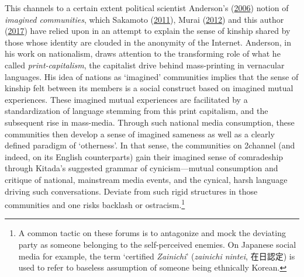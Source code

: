 \documentclass[10pt,british,A4paper,twoside]{memoir}
\begin{document}
This channels to a certain extent political scientist Anderson's
(\protect\hyperlink{ref-anderson_imagined_2006}{2006}) notion of
\emph{imagined communities}, which Sakamoto
(\protect\hyperlink{ref-sakamoto_koreans_2011}{2011}), Murai
(\protect\hyperlink{ref-murai_net_2012}{2012}) and this author
(\protect\hyperlink{ref-poppe_digitaal_2017}{2017}) have relied upon in
an attempt to explain the sense of kinship shared by those whose
identity are clouded in the anonymity of the Internet. Anderson, in his
work on nationalism, draws attention to the transforming role of what he
called \emph{print-capitalism}, the capitalist drive behind
mass-printing in vernacular languages. His idea of nations as `imagined'
communities implies that the sense of kinship felt between its members
is a social construct based on imagined mutual experiences. These
imagined mutual experiences are facilitated by a standardization of
language stemming from this print capitalism, and the subsequent rise in
mass-media. Through such national media consumption, these communities
then develop a sense of imagined sameness as well as a clearly defined
paradigm of `otherness'. In that sense, the communities on 2channel (and
indeed, on its English counterparts) gain their imagined sense of
comradeship through Kitada's suggested grammar of cynicism---mutual
consumption and critique of national, mainstream media events, and the
cynical, harsh language driving such conversations. Deviate from such
rigid structures in those communities and one risks backlash or
ostracism.\footnote{A common tactic on these forums is to antagonize and
  mock the deviating party as someone belonging to the self-perceived
  enemies. On Japanese social media for example, the term `certified
  \emph{Zainichi}' (\emph{zainichi nintei}, 在日認定) is used to refer
  to baseless assumption of someone being ethnically Korean.}
\end{document}
